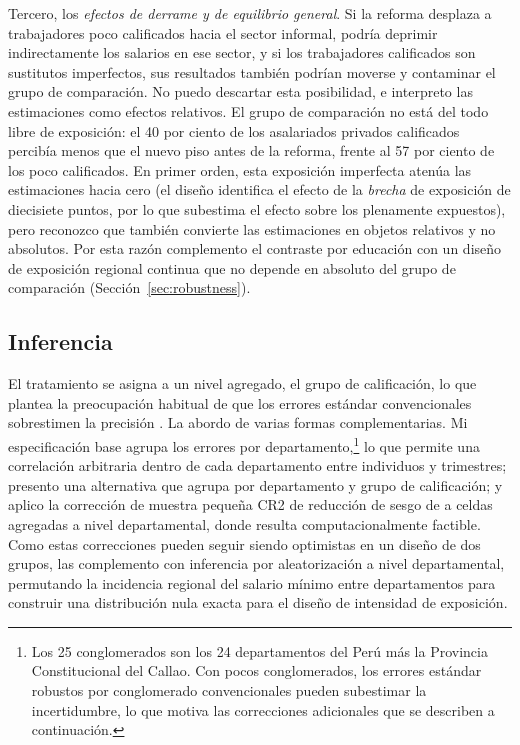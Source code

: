 Tercero, los \emph{efectos de derrame y de equilibrio general}. Si la reforma desplaza a trabajadores poco calificados hacia el sector informal, podría deprimir indirectamente los salarios en ese sector, y si los trabajadores calificados son sustitutos imperfectos, sus resultados también podrían moverse y contaminar el grupo de comparación. No puedo descartar esta posibilidad, e interpreto las estimaciones como efectos relativos. El grupo de comparación no está del todo libre de exposición: el 40 por ciento de los asalariados privados calificados percibía menos que el nuevo piso antes de la reforma, frente al 57 por ciento de los poco calificados. En primer orden, esta exposición imperfecta atenúa las estimaciones hacia cero (el diseño identifica el efecto de la \emph{brecha} de exposición de diecisiete puntos, por lo que subestima el efecto sobre los plenamente expuestos), pero reconozco que también convierte las estimaciones en objetos relativos y no absolutos. Por esta razón complemento el contraste por educación con un diseño de exposición regional continua que no depende en absoluto del grupo de comparación (Sección~\ref{sec:robustness}).

\subsection{Inferencia}

El tratamiento se asigna a un nivel agregado, el grupo de calificación, lo que plantea la preocupación habitual de que los errores estándar convencionales sobrestimen la precisión \citep{bertrand_2004}. La abordo de varias formas complementarias. Mi especificación base agrupa los errores por departamento,\footnote{Los 25 conglomerados son los 24 departamentos del Perú más la Provincia Constitucional del Callao. Con pocos conglomerados, los errores estándar robustos por conglomerado convencionales pueden subestimar la incertidumbre, lo que motiva las correcciones adicionales que se describen a continuación.} lo que permite una correlación arbitraria dentro de cada departamento entre individuos y trimestres; presento una alternativa que agrupa por departamento y grupo de calificación; y aplico la corrección de muestra pequeña CR2 de reducción de sesgo de \citet{pustejovsky_tipton_2018} a celdas agregadas a nivel departamental, donde resulta computacionalmente factible. Como estas correcciones pueden seguir siendo optimistas en un diseño de dos grupos, las complemento con inferencia por aleatorización a nivel departamental, permutando la incidencia regional del salario mínimo entre departamentos para construir una distribución nula exacta para el diseño de intensidad de exposición.
